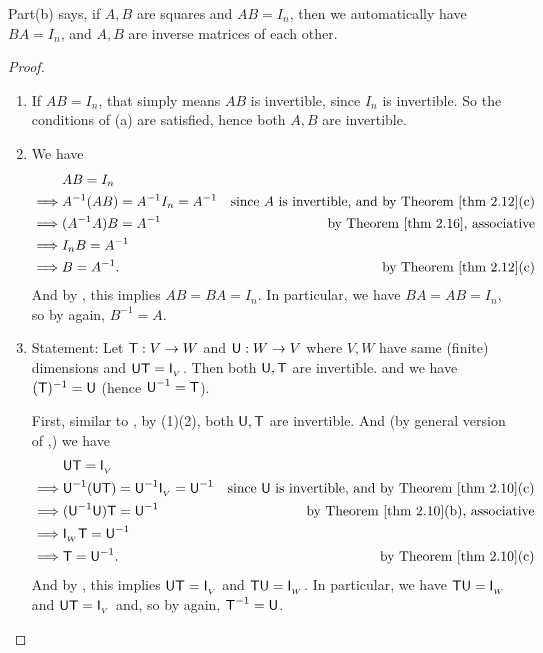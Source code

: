 \begin{note}
Part(b) says, if \(A, B\) are squares and \(AB = I_n\), then we automatically have \(BA = I_n\), and \(A, B\) are inverse matrices of each other.
\end{note}

\begin{proof} \ 
\begin{enumerate}
\item If \(AB = I_n\), that simply means \(AB\) is invertible, since \(I_n\) is invertible.
So the conditions of \EXEC{2.4.9}(a) are satisfied, hence both \(A, B\) are invertible.

\item We have
\begin{align*}
             & AB = I_n \\
    \implies & A^{-1} (AB) = A^{-1} I_n = A^{-1} & \text{since \(A\) is invertible, and by \THM{2.12}(c)} \\
    \implies & (A^{-1}A)B = A^{-1} & \text{by \THM{2.16}, associative} \\
    \implies & I_n B = A^{-1} \\
    \implies & B = A^{-1}. & \text{by \THM{2.12}(c)}
\end{align*}
And by , this implies \(AB = BA = I_n\).
In particular, we have \(BA = AB = I_n\), so by  again, \(B^{-1} = A\).

\item
Statement: Let \(\textsf{T} : V \to W\) and \(\textsf{U} : W \to V\) where \(V, W\) have same (finite) dimensions and \(\textsf{U}\textsf{T} = \textsf{I}_{_V}\).
Then both \(\textsf{U}, \textsf{T}\) are invertible. and we have \((\textsf{T})^{-1} = \textsf{U}\) (hence \(\textsf{U}^{-1} = \textsf{T}\)).

First, similar to , by (1)(2), both \(\textsf{U}, \textsf{T}\) are invertible.
And (by general version of \THM{2.10},) we have
\begin{align*}
             & \U\T = \ITRANV \\
    \implies & \U^{-1} (\U\T) = \U^{-1} \ITRANV = \U^{-1} & \text{since \(\U\) is invertible, and by \THM{2.10}(c)} \\
    \implies & (\U^{-1}\U)\T = \U^{-1} & \text{by \THM{2.10}(b), associative} \\
    \implies & \ITRANW \T = \U^{-1} \\
    \implies & \T = \U^{-1}. & \text{by \THM{2.10}(c)}
\end{align*}
And by , this implies \(\textsf{U}\textsf{T} = \textsf{I}_{_V}\) and \(\textsf{T}\textsf{U} = \textsf{I}_{_W}\).
In particular, we have \(\textsf{T}\textsf{U} = \textsf{I}_{_W}\) and \(\textsf{U}\textsf{T} = \textsf{I}_{_V}\) and, so by  again, \(\textsf{T}^{-1} = \textsf{U}\).
\end{enumerate}
\end{proof}

